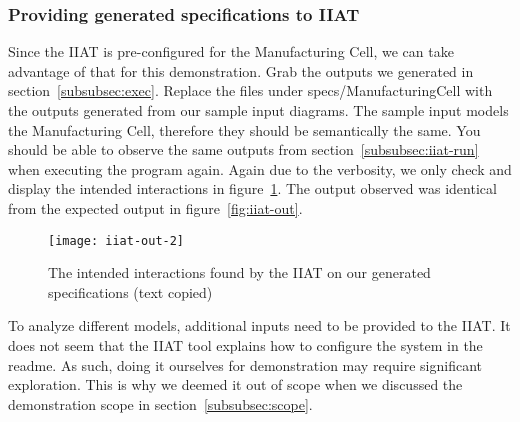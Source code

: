 \subsubsection{Providing generated specifications to IIAT}
Since the IIAT is pre-configured for the Manufacturing Cell,
we can take advantage of that for this demonstration.
Grab the outputs we generated in section~\ref{subsubsec:exec}.
Replace the files under specs/ManufacturingCell with the outputs generated from our sample input diagrams.
The sample input models the Manufacturing Cell, therefore they should be semantically the same.
You should be able to observe the same outputs from section~\ref{subsubsec:iiat-run} when executing the program again.
Again due to the verbosity, we only check and display the intended interactions in figure~\ref{fig:iiat-out2}.
The output observed was identical from the expected output in figure~\ref{fig:iiat-out}.
\begin{figure}[h]
    \centering
    \texttt{[image: iiat-out-2]}
    \caption{The intended interactions found by the IIAT on our generated specifications (text copied)}
    \label{fig:iiat-out2}
\end{figure}
To analyze different models, additional inputs need to be provided to the IIAT\@.
It does not seem that the IIAT tool explains how to configure the system in the readme.
As such, doing it ourselves for demonstration may require significant exploration.
This is why we deemed it out of scope when we discussed the demonstration scope in section~\ref{subsubsec:scope}.